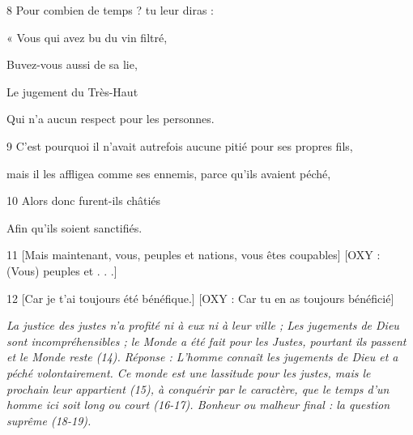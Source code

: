 \par 8 Pour combien de temps ? tu leur diras :

\par « Vous qui avez bu du vin filtré,

\par Buvez-vous aussi de sa lie,

\par Le jugement du Très-Haut

\par Qui n'a aucun respect pour les personnes.

\par 9 C'est pourquoi il n'avait autrefois aucune pitié pour ses propres fils,

\par mais il les affligea comme ses ennemis, parce qu'ils avaient péché,

\par 10 Alors donc furent-ils châtiés

\par Afin qu'ils soient sanctifiés.

\par 11 [Mais maintenant, vous, peuples et nations, vous êtes coupables] [OXY : (Vous) peuples et . . .]

\par [Parce que vous avez toujours foulé la terre,] [OXY : (Vous) avez foulé la terre]

\par [Et a utilisé injustement la création.] [OXY : Et a abusé des choses créées en elle.]

\par 12 [Car je t'ai toujours été bénéfique.] [OXY : Car tu en as toujours bénéficié]

\par [Et tu as toujours été ingrat pour la bienfaisance.] [OXY : Mais tu as toujours été ingrat.]


\par \textit{La justice des justes n'a profité ni à eux ni à leur ville ; Les jugements de Dieu sont incompréhensibles ; le Monde a été fait pour les Justes, pourtant ils passent et le Monde reste (14). Réponse : L'homme connaît les jugements de Dieu et a péché volontairement. Ce monde est une lassitude pour les justes, mais le prochain leur appartient (15), à conquérir par le caractère, que le temps d'un homme ici soit long ou court (16-17). Bonheur ou malheur final : la question suprême (18-19).}

